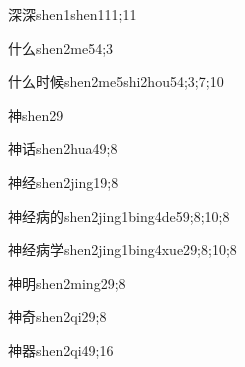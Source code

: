 \begin{verbete}{深深}{shen1shen1}{11;11}
\end{verbete}

\begin{verbete}{什么}{shen2me5}{4;3}
\end{verbete}

\begin{verbete}{什么时候}{shen2me5shi2hou5}{4;3;7;10}
\end{verbete}

\begin{verbete}{神}{shen2}{9}
\end{verbete}

\begin{verbete}{神话}{shen2hua4}{9;8}
\end{verbete}

\begin{verbete}{神经}{shen2jing1}{9;8}
\end{verbete}

\begin{verbete}{神经病的}{shen2jing1bing4de5}{9;8;10;8}
\end{verbete}

\begin{verbete}{神经病学}{shen2jing1bing4xue2}{9;8;10;8}
\end{verbete}

\begin{verbete}{神明}{shen2ming2}{9;8}
\end{verbete}

\begin{verbete}{神奇}{shen2qi2}{9;8}
\end{verbete}

\begin{verbete}{神器}{shen2qi4}{9;16}
\end{verbete}

